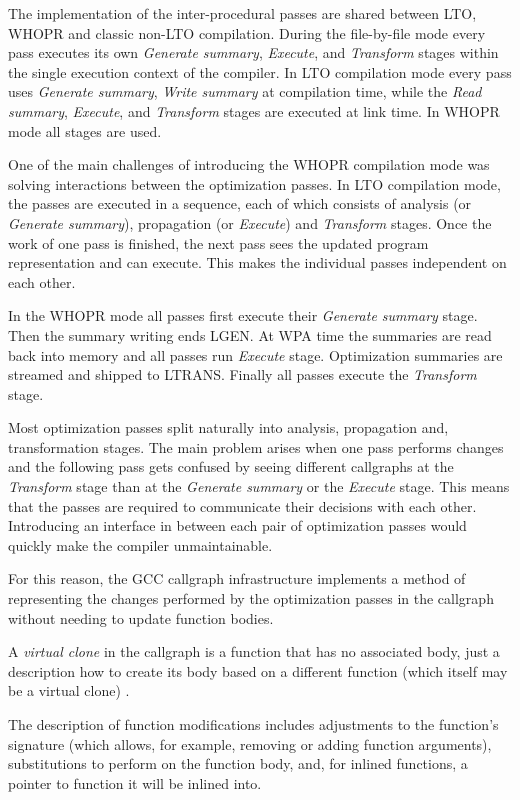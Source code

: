 \documentclass[final]{ols}
\begin{document}
The implementation of the inter-procedural passes are shared between LTO, WHOPR and
classic non-LTO compilation.
During the file-by-file mode
every pass executes its own {\em Generate summary}, {\em Execute}, and
{\em Transform} stages within the single execution context of the compiler. In LTO compilation mode every pass uses {\em Generate summary}, {\em Write
summary} at compilation time, while the {\em Read summary}, {\em Execute}, and {\em Transform} stages are executed at link time.
In WHOPR mode all stages are used.

One of the main challenges of introducing the WHOPR compilation mode was
solving interactions between the optimization passes.  In LTO
compilation mode, the passes are executed in a sequence, each of which consists of
analysis (or {\em Generate summary}), propagation (or {\em Execute}) and {\em Transform}
stages. Once the work of one pass is finished, the next pass sees the updated program
representation and can execute. This makes the individual passes
independent on each other.

In the WHOPR mode all passes first execute their {\em Generate summary} stage.
Then the summary writing ends LGEN.  At WPA time the summaries are read back
into memory and all passes run {\em Execute} stage.  Optimization summaries are
streamed and shipped to LTRANS. Finally all passes execute the {\em Transform}
stage.

Most optimization passes split naturally into analysis, propagation
and, transformation stages. The main problem arises when one pass performs
changes and the following pass gets confused by seeing different callgraphs at
the {\em Transform} stage than at the {\em Generate summary} or the {\em
Execute} stage.  This means that the passes are required to communicate
their decisions with each other. Introducing an interface in between each pair of optimization
passes would quickly make the compiler unmaintainable.

For this reason, the GCC callgraph infrastructure implements a method of
representing the changes performed by the optimization passes in the
callgraph without needing to update function bodies.

A {\em virtual clone} in the callgraph is a function that has no associated
body, just a description how to create its body based on a different function
(which itself may be a virtual clone) \cite{callgraph2007}. 

The description of function modifications includes adjustments to the function's
signature (which allows, for example, removing or adding function arguments),
substitutions to perform on the function body, and, for inlined functions, a pointer
to function it will be inlined into.
\end{document}
